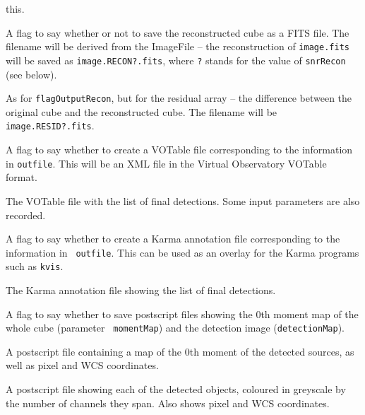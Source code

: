 \documentclass[12pt,a4paper]{article}
\newcommand{\entrylabel}[1]{\mbox{\textsf{\bf{#1:}}}\hfil}
\newenvironment{entry}
        {\begin{list}{}%
                {\renewcommand{\makelabel}{\entrylabel}%
                        \setlength{\labelwidth}{30mm}%
                        \setlength{\labelsep}{5pt}%
                        \setlength{\itemsep}{2pt}%
                        \setlength{\parsep}{2pt}%
                        \setlength{\leftmargin}{35mm}%
                }%
        }%
{\end{list}}
\begin{document}
\begin{entry}
  this.
\item[flagOutputRecon {\tt [false]}] A flag to say whether or not to
  save the reconstructed cube as a FITS file. The filename will be
  derived from the ImageFile -- the reconstruction of {\tt image.fits}
  will be saved as {\tt image.RECON?.fits}, where {\tt ?} stands for
  the value of {\tt snrRecon} (see below).
\item[flagOutputResid {\tt [false]}] As for {\tt flagOutputRecon}, but
  for the residual array -- the difference between the original cube
  and the reconstructed cube. The filename will be {\tt
  image.RESID?.fits}.
\item[flagVOT {\tt [false]}] A flag to say whether to create a VOTable
  file corresponding to the information in {\tt outfile}. This will be
  an XML file in the Virtual Observatory VOTable format.
\item[votFile {\tt [./duchamp-Results.xml]}] The VOTable file with the
  list of final detections. Some input parameters are also recorded.
\item[flagKarma {\tt [false]}] A flag to say whether to create a Karma
  annotation file corresponding to the information in {\tt
  outfile}. This can be used as an overlay for the Karma programs such
  as {\tt kvis}.
\item[karmaFile {\tt [./duchamp-Results.ann]}] The Karma annotation
  file showing the list of final detections. 
\item[flagMaps {\tt [true]}] A flag to say whether to save postscript
  files showing the 0th moment map of the whole cube (parameter {\tt
  momentMap}) and the detection image ({\tt detectionMap}).
\item[momentMap {\tt [./latest-moment-map.ps]}] A postscript file
  containing a map of the 0th moment of the detected sources, as well
  as pixel and WCS coordinates.
\item[detectionMap {\tt [./latest-detection-map.ps]}] A postscript
  file showing each of the detected objects, coloured in greyscale by
  the number of channels they span. Also shows pixel and WCS
  coordinates.
\end{entry}
\end{document}
